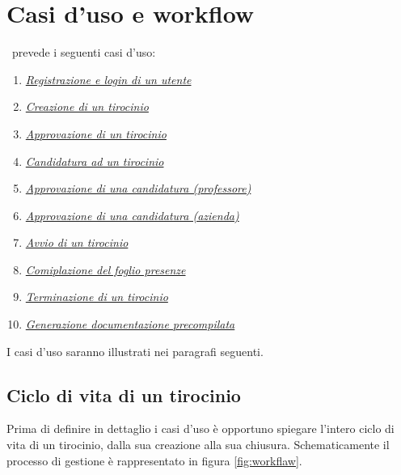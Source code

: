 \chapter{Casi d'uso e workflow}

\projectName~prevede i seguenti casi d'uso:
\begin{enumerate}
	\item \hyperref[sec:registrazione-e-login-di-un-utente]{\textit{Registrazione e login di un utente}}
	\item \hyperref[sec:creazione--di-un-tirocinio]{\textit{Creazione di un tirocinio}}
	\item \hyperref[sec:approvazione-di-un-tirocinio]{\textit{Approvazione di un tirocinio}}
	\item \hyperref[sec:candidatura-ad-un-tirocinio]{\textit{Candidatura ad un tirocinio}}
	\item \hyperref[sec:approvazione-candidatura-professore]{\textit{Approvazione di una candidatura (professore)}}
	\item \hyperref[sec:approvazione-candidatura-azienda]{\textit{Approvazione di una candidatura (azienda)}}
	\item \hyperref[sec:avvio-di-un-tirocinio]{\textit{Avvio di un tirocinio}}
	\item \hyperref[sec:compilazione-foglio-presenze]{\textit{Comiplazione del foglio presenze}}
	\item \hyperref[sec:terminazione-di-un-tirocinio]{\textit{Terminazione di un tirocinio}}
	\item \hyperref[sec:generazione-documentazione]{\textit{Generazione documentazione precompilata}}
\end{enumerate}
I casi d'uso saranno illustrati nei paragrafi seguenti.

\section{Ciclo di vita di un tirocinio}
Prima di definire in dettaglio i casi d'uso è opportuno spiegare l'intero ciclo di vita di un tirocinio, dalla sua creazione alla sua chiusura. Schematicamente il processo di gestione è rappresentato in figura \ref{fig:workflaw}.

